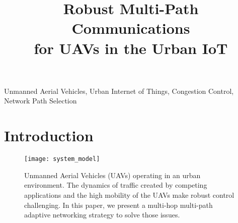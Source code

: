 \documentclass[conference]{IEEEtran}
\begin{document}
\title{Robust Multi-Path Communications\\ for UAVs in the Urban IoT}
\author
{
\vspace{-8mm}
}


\maketitle



\begin{abstract}

\end{abstract}

\vspace{1mm}
\begin {IEEEkeywords}
Unmanned Aerial Vehicles, Urban Internet of Things, Congestion Control, Network Path Selection
\end{IEEEkeywords}



\section{Introduction}
\label{intro}



\begin{figure*}[!t]
   \centering
   \texttt{[image: system\_model]}
    \vspace{-0.2cm}
    \caption{Unmanned Aerial Vehicles (UAVs) operating in an urban environment. The dynamics of traffic created by competing applications and the high mobility of the UAVs make robust control challenging. In this paper, we present a multi-hop multi-path adaptive networking strategy to solve those issues.}
    \vspace{-0.4cm}
    \label{fig:uaviot}
\end{figure*}
\end{document}
